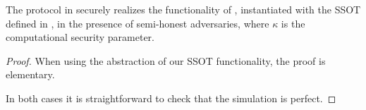 \begin{theorem}
\label{thm:sot}
The \SSOT protocol in  securely realizes the  functionality of , instantiated with the SSOT defined in , in the presence of semi-honest adversaries, where $\kappa$ is the computational security parameter.
\end{theorem}


\begin{proof}
%
When using the abstraction of our SSOT functionality, the proof is elementary.

In both cases it is straightforward to check that the simulation is perfect.
\end{proof}

 